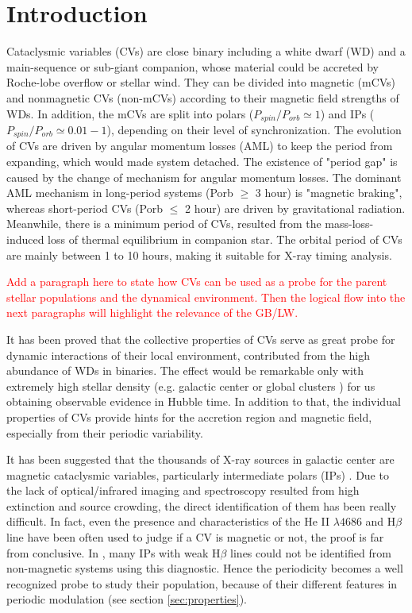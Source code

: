 \documentclass[twoside,twocolumn]{aastex63}
\begin{document}
\section{Introduction} \label{sec:intro}
Cataclysmic variables (CVs) are close binary including a white dwarf (WD) and a main-sequence or sub-giant companion, whose material could be accreted by Roche-lobe overflow or stellar wind. 
They can be divided into magnetic (mCVs) and nonmagnetic CVs (non-mCVs) according to their magnetic field strengths of WDs. In addition, the mCVs are split into polars ($P_{spin}/P_{orb}\simeq 1$) and IPs ($P_{spin}/P_{orb}\simeq 0.01-1$), depending on their level of synchronization. 
The evolution of CVs are driven by angular momentum losses (AML) to keep the period from expanding, which would made system detached. The existence of  "period gap" is caused by the change of mechanism for angular momentum losses.  The dominant AML mechanism in long-period
systems (Porb $\geq$ 3 hour) is "magnetic braking", whereas short-period CVs (Porb $\leq$ 2 hour) are  driven by gravitational radiation. Meanwhile, there is a minimum period of CVs, resulted from the mass-loss-induced loss of thermal equilibrium in companion star. The orbital period of CVs are mainly between 1 to 10 hours, making it suitable for X-ray timing analysis. 

\textcolor{red}{Add a paragraph here to state how CVs can be used as a probe for the parent stellar populations and the dynamical environment. Then the logical flow into the next paragraphs will highlight the relevance of the GB/LW.}

It has been proved that the collective properties of CVs serve as great probe for dynamic interactions of their local environment, contributed from the high abundance of WDs in binaries. The effect would be remarkable only with extremely high stellar density (e.g. galactic center or global clusters \citep{2019ApJ...876...59C}) for us obtaining observable evidence in Hubble time. 
In addition to that, the individual properties of CVs provide hints for the accretion region and magnetic field, especially from their periodic variability.

It has been suggested that the thousands of X-ray sources in galactic center are magnetic cataclysmic variables, particularly intermediate
polars (IPs) \citep{2009ApJS..181..110M,2018ApJS..235...26Z}. Due to the lack of optical/infrared imaging and spectroscopy resulted from high extinction and source crowding, the direct identification of them has been really difficult.
In fact, even the presence and characteristics of the He II $\lambda 4686$ and H$\beta$ line have been often used to judge if a CV is magnetic or not, the proof is far from conclusive. In \cite{1992PhDT.......119S}, many IPs with weak H$\beta$ lines could not be identified from non-magnetic systems using this diagnostic. 
Hence the periodicity becomes a well recognized probe to study their population, because of their different features in periodic modulation (see section \ref{sec:properties}).  
\end{document}
